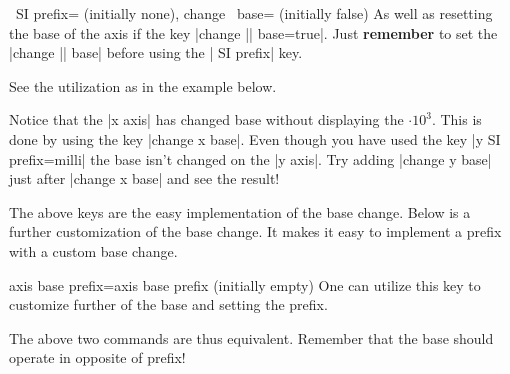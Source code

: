 \begin{pgfplotsxykeylist}{\x\ SI prefix= (initially none),
      change \x\ base= (initially false)}
  As well as resetting the base of the axis if the key |change || base=true|. Just \textbf{remember} to
  set the |change || base| before using the | SI prefix| key. 

  See the utilization as in the example below.
\begin{codeexample}[]
\end{codeexample}
  Notice that the |x axis| has changed base without displaying the $\cdot 10^{3}$. This is done by using the key |change x base|. Even though you have used
  the key |y SI prefix=milli| the base isn't changed on the |y axis|. Try adding |change y base| just after |change x base| and see the result!
\end{pgfplotsxykeylist}

The above keys are the easy implementation of the base change. Below is a further customization of the base change. It makes it easy to implement a prefix
with a custom base change.

\begin{pgfplotskey}{axis base prefix={axis  base  prefix } (initially empty)}
  One can utilize this key to customize further of the base and setting the prefix.
\begin{codeexample}
\pgfplotsset{change x base,x SI prefix=kilo}
\end{codeexample}
  The above two commands are thus equivalent. Remember that the base should operate in opposite of prefix!
\end{pgfplotskey}
